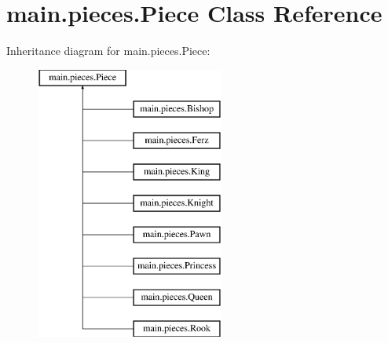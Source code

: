 \hypertarget{classmain_1_1pieces_1_1_piece}{}\section{main.\+pieces.\+Piece Class Reference}
\label{classmain_1_1pieces_1_1_piece}
Inheritance diagram for main.\+pieces.\+Piece\+:\begin{figure}[H]
\begin{center}
\leavevmode
\includegraphics[height=9.000000cm]{classmain_1_1pieces_1_1_piece}
\end{center}
\end{figure}
